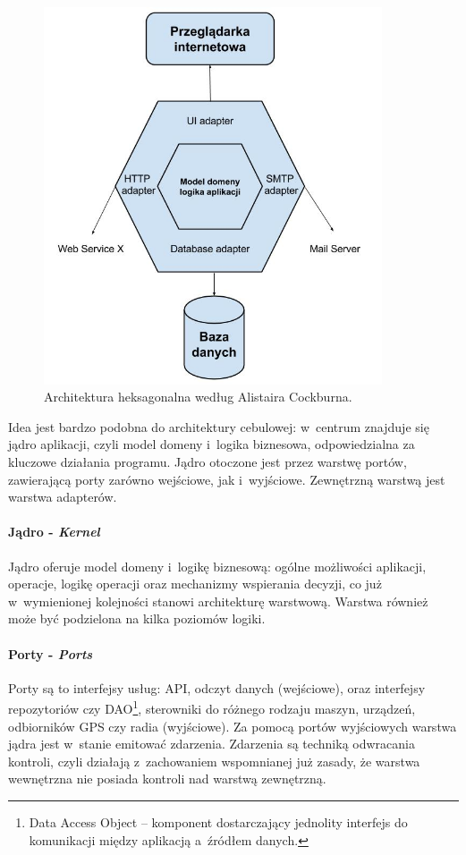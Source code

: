 \begin{figure}[!htb]
    \centering
    \includegraphics[width=10cm]{imgs/ch4_hexagonal_architecture_3.jpg}
    \caption
{Architektura heksagonalna według Alistaira Cockburna.}
    \label{fig:hexagonal_architecture}
\end{figure} 

Idea jest bardzo podobna do architektury cebulowej: w~centrum znajduje się jądro aplikacji, czyli model domeny i~logika biznesowa, odpowiedzialna za kluczowe działania programu. Jądro otoczone jest przez warstwę portów, zawierającą porty zarówno wejściowe, jak i~wyjściowe. Zewnętrzną warstwą jest warstwa adapterów.

\paragraph{Jądro - \textit{Kernel}}
Jądro oferuje model domeny i~logikę biznesową: ogólne możliwości aplikacji, operacje, logikę operacji oraz mechanizmy wspierania decyzji, co już w~wymienionej kolejności stanowi architekturę warstwową. Warstwa również może być podzielona na kilka poziomów logiki. 

\paragraph{Porty - \textit{Ports}}
Porty są to interfejsy usług: API, odczyt danych (wejściowe), oraz interfejsy repozytoriów czy DAO\footnote{Data Access Object – komponent dostarczający jednolity interfejs do komunikacji między aplikacją a~źródłem danych.}, sterowniki do różnego rodzaju maszyn, urządzeń, odbiorników GPS czy radia (wyjściowe). Za pomocą portów wyjściowych warstwa jądra jest w~stanie emitować zdarzenia. Zdarzenia są techniką odwracania kontroli, czyli działają z~zachowaniem wspomnianej już zasady, że warstwa wewnętrzna nie posiada kontroli nad warstwą zewnętrzną. 

